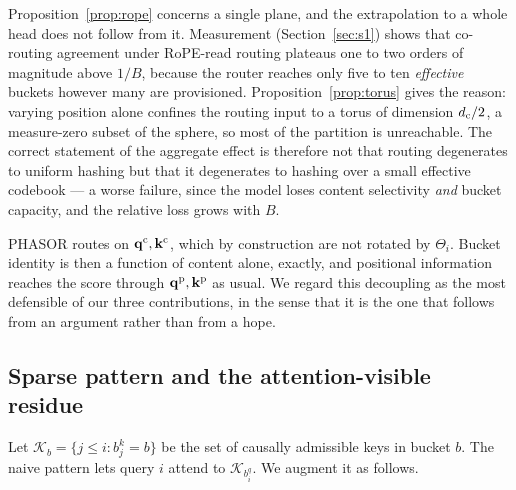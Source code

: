\begin{remark}
\label{rem:eff-buckets}
Proposition~\ref{prop:rope} concerns a single plane, and the extrapolation to a whole head does not follow from it. Measurement (Section~\ref{sec:s1}) shows that co-routing agreement under RoPE-read routing plateaus one to two orders of magnitude above $1/B$, because the router reaches only five to ten \emph{effective} buckets however many are provisioned. Proposition~\ref{prop:torus} gives the reason: varying position alone confines the routing input to a torus of dimension $d_{\mathrm{c}}/2$, a measure-zero subset of the sphere, so most of the partition is unreachable. The correct statement of the aggregate effect is therefore not that routing degenerates to uniform hashing but that it degenerates to hashing over a small effective codebook --- a worse failure, since the model loses content selectivity \emph{and} bucket capacity, and the relative loss grows with $B$.
\end{remark}

PHASOR routes on $\mathbf{q}^{\mathrm{c}}, \mathbf{k}^{\mathrm{c}}$, which by construction are not rotated by $\Theta_i$. Bucket identity is then a function of content alone, exactly, and positional information reaches the score through $\mathbf{q}^{\mathrm{p}},\mathbf{k}^{\mathrm{p}}$ as usual. We regard this decoupling as the most defensible of our three contributions, in the sense that it is the one that follows from an argument rather than from a hope.

\subsection{Sparse pattern and the attention-visible residue}
\label{sec:fallback}

Let $\mathcal{K}_b = \{ j \le i : b^k_j = b \}$ be the set of causally admissible keys in bucket $b$. The naive pattern lets query $i$ attend to $\mathcal{K}_{b^q_i}$. We augment it as follows.

